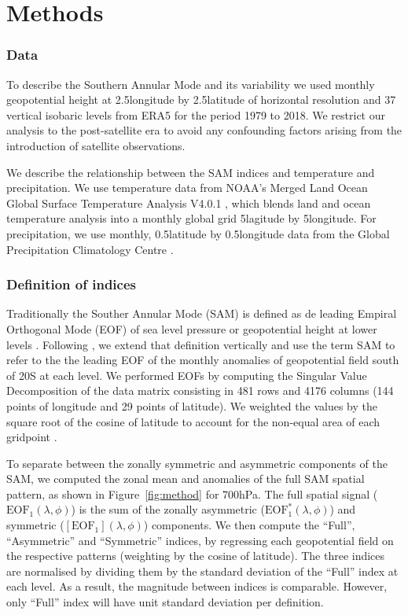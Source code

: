 \documentclass[twocol]{ametsocV5}
\begin{document}
\section{Methods}

\subsubsection{Data}

To describe the Southern Annular Mode and its variability we used
monthly geopotential height at 2.5\degree longitude by
2.5\degree latitude of horizontal resolution and 37 vertical isobaric
levels from ERA5 \citep{hersbach2020} for the period 1979 to 2018. We
restrict our analysis to the post-satellite era to avoid any confounding
factors arising from the introduction of satellite observations.

We describe the relationship between the SAM indices and temperature and
precipitation. We use temperature data from NOAA's Merged Land Ocean
Global Surface Temperature Analysis V4.0.1 \citep{vose2012, smith2008},
which blends land and ocean temperature analysis into a monthly global
grid 5\degree lagitude by 5\degree longitude. For precipitation, we use
monthly, 0.5\degree latitude by 0.5\degree longitude data from the
Global Precipitation Climatology Centre \citep{schneider2015}.

\subsubsection{Definition of indices}

Traditionally the Souther Annular Mode (SAM) is defined as de leading
Empiral Orthogonal Mode (EOF) of sea level pressure or geopotential
height at lower levels \citep{ho2012}. Following \citet{baldwin2001}, we
extend that definition vertically and use the term SAM to refer to the
the leading EOF of the monthly anomalies of geopotential field south of
20\degree S at each level. We performed EOFs by computing the Singular
Value Decomposition of the data matrix consisting in 481 rows and 4176
columns (144 points of longitude and 29 points of latitude). We weighted
the values by the square root of the cosine of latitude to account for
the non-equal area of each gridpoint \citep{chung1999}.

To separate between the zonally symmetric and asymmetric components of
the SAM, we computed the zonal mean and anomalies of the full SAM
spatial pattern, as shown in Figure~\ref{fig:method} for 700hPa. The
full spatial signal (\(\mathrm{EOF_1}(\lambda, \phi)\)) is the sum of
the zonally asymmetric (\(\mathrm{EOF_1^*}(\lambda, \phi)\)) and
symmetric (\([\mathrm{EOF_1}](\lambda, \phi)\)) components. We then
compute the ``Full'', ``Asymmetric'' and ``Symmetric'' indices, by
regressing each geopotential field on the respective patterns (weighting
by the cosine of latitude). The three indices are normalised by dividing
them by the standard deviation of the ``Full'' index at each level. As a
result, the magnitude between indices is comparable. However, only
``Full'' index will have unit standard deviation per definition.
\end{document}
